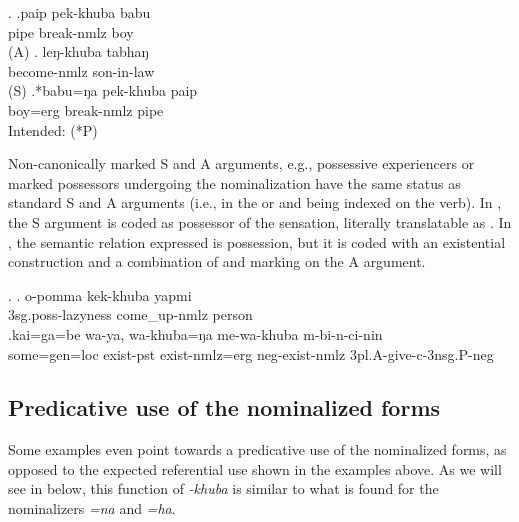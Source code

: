 \ex. \ag.paip pek-khuba babu\\
	pipe break-{\sc nmlz} boy\\
	 (A)
	\bg. leŋ-khuba tabhaŋ\\
	become{\sc -nmlz} son-in-law\\
	 (S)
	 \bg.*babu=ŋa pek-khuba paip\\ 
	boy{\sc =erg} break-{\sc nmlz} pipe		\\ 
	Intended:  (*P)
	
 
Non-canonically marked S and A arguments, e.g., possessive experiencers or  marked possessors undergoing the nominalization have the same status as standard S and A arguments (i.e., in the  or   and being indexed on the verb). In  \Next[a], the  S argument is coded as possessor of the sensation, literally translatable as . In \Next[b], the semantic relation expressed is possession, but it is coded with an existential construction and a combination of  and  marking on the A argument.


\ex. \ag. o-pomma kek-khuba yapmi\\
	{\sc 3sg.poss}-lazyness come\_up-{\sc nmlz} person	\\
\bg.kai=ga=be  wa-ya, wa-khuba=ŋa   me-wa-khuba    m-bi-n-ci-nin\\
		some{\sc =gen=loc} exist{\sc [3sg]-pst}  exist-{\sc nmlz=erg} {\sc neg}-exist-{\sc nmlz} {\sc 3pl.A}-give{\sc [pst]-c-3nsg.P-neg}	\\
	 

	
\subsection{Predicative use of the nominalized forms}
	
Some examples even point towards a predicative use of the nominalized forms, as opposed to the expected referential use shown in the examples above. As we will see in  below, this function of \emph{-khuba} is similar to what is found for the nominalizers \emph{=na} and \emph{=ha}.

